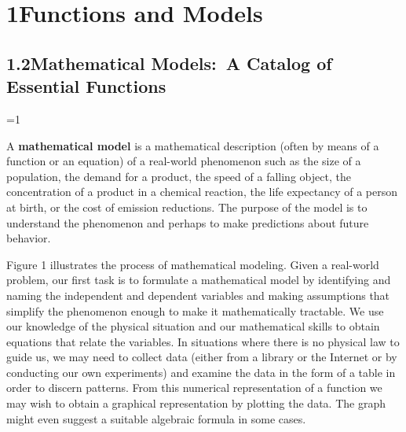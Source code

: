 \documentclass{sebase}
\begin{document}
\chapter{1\quad Functions and Models}

\section{1.2\quad Mathematical Models:\ A Catalog of Essential Functions}

\noCCC%
\setET%
\renewcommand{\RM}{0}%
\renewcommand{\RM}{1}%
\ifnum\RM=1 \setcounter{page}{18}\else \setcounter{page}{15}\fi%

A \textbf{mathematical model} is a mathematical description (often by means
of a function or an equation) of a real-world phenomenon such as the size of
a population, the demand for a product, the speed of a falling object, the
concentration of a product in a chemical reaction, the life expectancy of a
person at birth, or the cost of emission reductions. The purpose of the
model is to understand the phenomenon and perhaps to make predictions about
future behavior.

Figure 1 illustrates the process of mathematical modeling. Given a
real-world problem, our first task is to formulate a mathematical model by
identifying and naming the independent and dependent variables and making
assumptions that simplify the phenomenon enough to make it mathematically
tractable. We use our knowledge of the physical situation and our
mathematical skills to obtain equations that relate the variables. In
situations where there is no physical law to guide us, we may need to
collect data (either from a library or the Internet or by conducting our own
experiments) and examine the data in the form of a table in order to discern
patterns. From this numerical representation of a function we may wish to
obtain a graphical representation by plotting the data. The graph might even
suggest a suitable algebraic formula in some cases.

\vspace{12pt}\hskip-190pt\hfil%
%
\vspace{12pt}\hfil%
\end{document}
